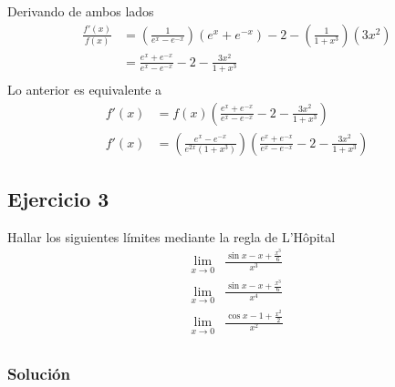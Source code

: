 \documentclass[a4paper]{article}
\begin{document}
Derivando de ambos lados
\begin{align*}
    \frac{f'(x)}{f(x)} &= \left(\frac{1}{e^{x} - e^{-x}}\right)\left(e^{x} + e^{-x}\right) - 2 - \left(\frac{1}{1 + x^3}\right)\left(3x^2\right) \\
                       &= \frac{e^{x} + e^{-x}}{e^{x} - e^{-x}} - 2 - \frac{3x^2}{1 + x^3} \\
\end{align*}
Lo anterior es equivalente a
\begin{align*}
    f'(x) &= f(x) \left(\frac{e^{x} + e^{-x}}{e^{x} - e^{-x}} - 2 - \frac{3x^2}{1 + x^3}\right) \\
    f'(x) &= \left(\frac{e^{x} - e^{-x}}{e^{2x}(1 + x^3)}\right)\left(\frac{e^{x} + e^{-x}}{e^{x} - e^{-x}} - 2 - \frac{3x^2}{1 + x^3}\right)
\end{align*}
\subsection{Ejercicio 3}
\noindent
Hallar los siguientes límites mediante la regla de L'Hôpital
\begin{align*}
    \lim_{x \to 0} &\frac{\sin{x} - x + \frac{x^3}{6}}{x^3} \\
    \lim_{x \to 0} &\frac{\sin{x} - x + \frac{x^3}{6}}{x^4} \\
    \lim_{x \to 0} &\frac{\cos{x} - 1 + \frac{x^2}{2}}{x^2} \\
\end{align*}
\subsubsection*{Solución}
\end{document}
